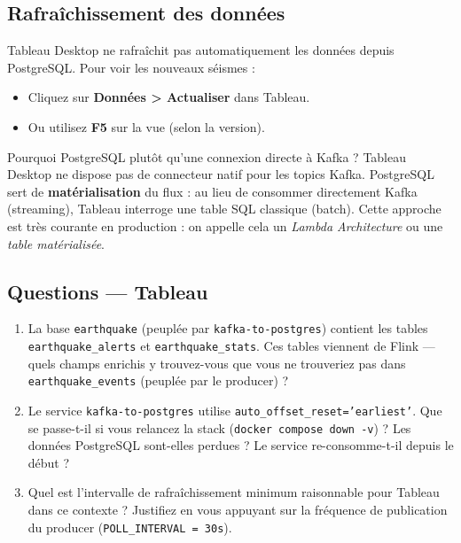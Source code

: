 \documentclass[12pt,a4paper]{article}
\begin{document}
\subsection{Rafraîchissement des données}

Tableau Desktop ne rafraîchit pas automatiquement les données depuis PostgreSQL.
Pour voir les nouveaux séismes :

\begin{itemize}
  \item Cliquez sur \textbf{Données > Actualiser} dans Tableau.
  \item Ou utilisez \textbf{F5} sur la vue (selon la version).
\end{itemize}

\begin{conceptbox}{Pourquoi PostgreSQL plutôt qu'une connexion directe à Kafka ?}
  Tableau Desktop ne dispose pas de connecteur natif pour les topics Kafka.
  PostgreSQL sert de \textbf{matérialisation} du flux : au lieu de consommer
  directement Kafka (streaming), Tableau interroge une table SQL classique
  (batch). Cette approche est très courante en production :
  on appelle cela un \textit{Lambda Architecture} ou une \textit{table matérialisée}.
\end{conceptbox}

\subsection*{Questions --- Tableau}

\begin{enumerate}[label=\textbf{Q\arabic*.}]
  \item La base \texttt{earthquake} (peuplée par \texttt{kafka-to-postgres}) contient
        les tables \texttt{earthquake\_alerts} et \texttt{earthquake\_stats}.
        Ces tables viennent de Flink --- quels champs enrichis y trouvez-vous
        que vous ne trouveriez pas dans \texttt{earthquake\_events} (peuplée par le producer) ?
  \item Le service \texttt{kafka-to-postgres} utilise \texttt{auto\_offset\_reset='earliest'}.
        Que se passe-t-il si vous relancez la stack (\texttt{docker compose down -v}) ?
        Les données PostgreSQL sont-elles perdues ? Le service re-consomme-t-il depuis le début ?
  \item Quel est l'intervalle de rafraîchissement minimum raisonnable pour Tableau
        dans ce contexte ? Justifiez en vous appuyant sur la fréquence de publication
        du producer (\texttt{POLL\_INTERVAL = 30s}).
\end{enumerate}
\end{document}
